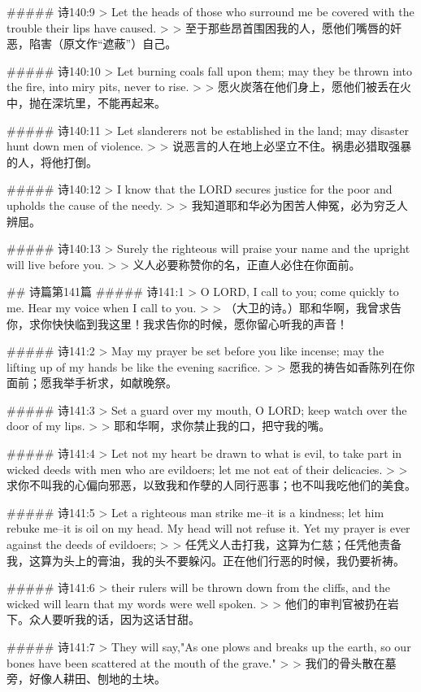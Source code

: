 ##### 诗140:9
> Let the heads of those who surround me be covered with the trouble their lips have caused.
>
> 至于那些昂首围困我的人，愿他们嘴唇的奸恶，陷害（原文作“遮蔽”）自己。


##### 诗140:10
> Let burning coals fall upon them; may they be thrown into the fire, into miry pits, never to rise.
>
> 愿火炭落在他们身上，愿他们被丢在火中，抛在深坑里，不能再起来。


##### 诗140:11
> Let slanderers not be established in the land; may disaster hunt down men of violence.
>
> 说恶言的人在地上必坚立不住。祸患必猎取强暴的人，将他打倒。


##### 诗140:12
> I know that the LORD secures justice for the poor and upholds the cause of the needy.
>
> 我知道耶和华必为困苦人伸冤，必为穷乏人辨屈。


##### 诗140:13
> Surely the righteous will praise your name and the upright will live before you.
>
> 义人必要称赞你的名，正直人必住在你面前。


## 诗篇第141篇
##### 诗141:1
> O LORD, I call to you; come quickly to me. Hear my voice when I call to you.
>
> （大卫的诗。）耶和华啊，我曾求告你，求你快快临到我这里！我求告你的时候，愿你留心听我的声音！


##### 诗141:2
> May my prayer be set before you like incense; may the lifting up of my hands be like the evening sacrifice.
>
> 愿我的祷告如香陈列在你面前；愿我举手祈求，如献晚祭。


##### 诗141:3
> Set a guard over my mouth, O LORD; keep watch over the door of my lips.
>
> 耶和华啊，求你禁止我的口，把守我的嘴。


##### 诗141:4
> Let not my heart be drawn to what is evil, to take part in wicked deeds with men who are evildoers; let me not eat of their delicacies.
>
> 求你不叫我的心偏向邪恶，以致我和作孽的人同行恶事；也不叫我吃他们的美食。


##### 诗141:5
> Let a righteous man strike me--it is a kindness; let him rebuke me--it is oil on my head. My head will not refuse it. Yet my prayer is ever against the deeds of evildoers;
>
> 任凭义人击打我，这算为仁慈；任凭他责备我，这算为头上的膏油，我的头不要躲闪。正在他们行恶的时候，我仍要祈祷。


##### 诗141:6
> their rulers will be thrown down from the cliffs, and the wicked will learn that my words were well spoken.
>
> 他们的审判官被扔在岩下。众人要听我的话，因为这话甘甜。


##### 诗141:7
> They will say,"As one plows and breaks up the earth, so our bones have been scattered at the mouth of the grave."
>
> 我们的骨头散在墓旁，好像人耕田、刨地的土块。


